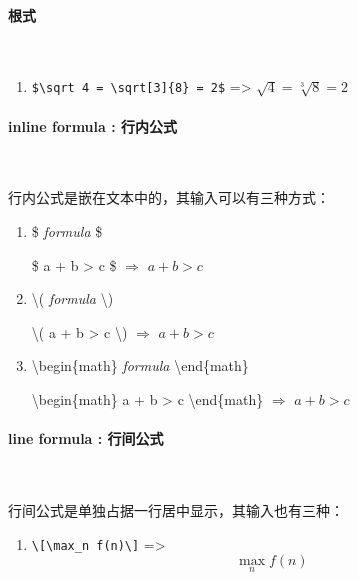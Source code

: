 \paragraph{根式}~{}

\begin{enumerate}[topsep=0pt,itemsep=0pt,parsep=0pt,leftmargin=3.6em,label=\arabic*>]
    \item {\color{teal}\verb!$\sqrt 4 = \sqrt[3]{8} = 2$!} => $\sqrt 4 = \sqrt[3]{8} = 2$
\end{enumerate}

\paragraph{inline formula : 行内公式}~{}

行内公式是嵌在文本中的，其输入可以有三种方式：

\begin{enumerate}[topsep=0pt,itemsep=0pt,parsep=0pt,leftmargin=3.6em,label=\arabic*>]
    \item \$ \emph{formula} \$ \par
        {\color{DefinedColorGreen}\$ a + b > c \$} 
        $\Rightarrow$ %
        {\color{DefinedColorRed}$a + b > c$}
    \item \textbackslash( \emph{formula} \textbackslash) \par
        {\color{DefinedColorGreen}\textbackslash( a + b > c \textbackslash)} 
        $\Rightarrow$ %
        {\color{DefinedColorRed}\(a + b > c\)}
    \item \textbackslash begin\{math\} \emph{formula} \textbackslash end\{math\} \par
        {\color{DefinedColorGreen} \textbackslash begin\{math\} a + b > c \textbackslash end\{math\}} 
        $\Rightarrow$ %
        {\color{DefinedColorRed}\begin{math} a + b > c \end{math} }
\end{enumerate}

\paragraph{line formula : 行间公式}~{}

行间公式是单独占据一行居中显示，其输入也有三种：
\begin{enumerate}[topsep=0pt,itemsep=0pt,parsep=0pt,leftmargin=3.6em,label=\arabic*>]
    \item {\color{teal}\verb!\[\max_n f(n)\]!} => \[\max_n f(n)\]
\end{enumerate}

